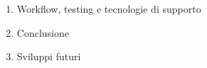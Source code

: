 \documentclass[a4paper, 11pt]{report}
\begin{document}
\begin{enumerate}[label*=\arabic*.]

\item Workflow, testing e tecnologie di supporto
\item Conclusione
\item Sviluppi futuri
\end{enumerate}





%




\end{document}
